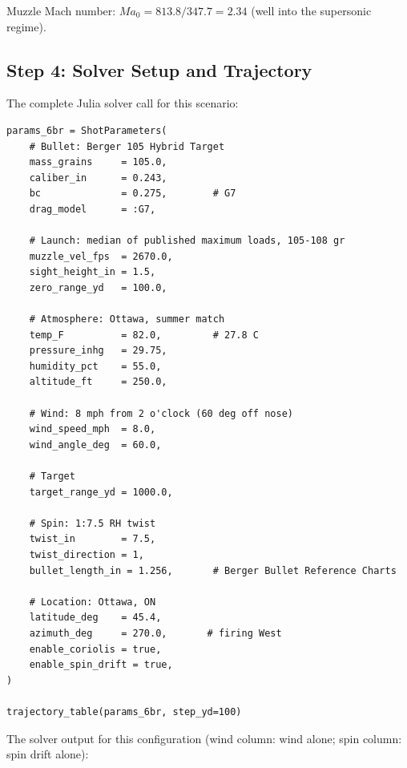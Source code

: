\documentclass[11pt,twoside,openright]{report}
\newcommand{\Mach}{\mathit{Ma}}
\begin{document}
Muzzle Mach number: $\Mach_0 = 813.8/347.7 = 2.34$ (well into the supersonic regime).

\subsection{Step 4: Solver Setup and Trajectory}

The complete Julia solver call for this scenario:

\begin{lstlisting}[caption={6mm BR complete trajectory example},label={lst:6br_example}]
params_6br = ShotParameters(
    # Bullet: Berger 105 Hybrid Target
    mass_grains     = 105.0,
    caliber_in      = 0.243,
    bc              = 0.275,        # G7
    drag_model      = :G7,

    # Launch: median of published maximum loads, 105-108 gr
    muzzle_vel_fps  = 2670.0,
    sight_height_in = 1.5,
    zero_range_yd   = 100.0,

    # Atmosphere: Ottawa, summer match
    temp_F          = 82.0,         # 27.8 C
    pressure_inhg   = 29.75,
    humidity_pct    = 55.0,
    altitude_ft     = 250.0,

    # Wind: 8 mph from 2 o'clock (60 deg off nose)
    wind_speed_mph  = 8.0,
    wind_angle_deg  = 60.0,

    # Target
    target_range_yd = 1000.0,

    # Spin: 1:7.5 RH twist
    twist_in        = 7.5,
    twist_direction = 1,
    bullet_length_in = 1.256,       # Berger Bullet Reference Charts

    # Location: Ottawa, ON
    latitude_deg    = 45.4,
    azimuth_deg     = 270.0,       # firing West
    enable_coriolis = true,
    enable_spin_drift = true,
)

trajectory_table(params_6br, step_yd=100)
\end{lstlisting}

The solver output for this configuration (wind column: wind alone; spin column: spin drift alone):
\end{document}
